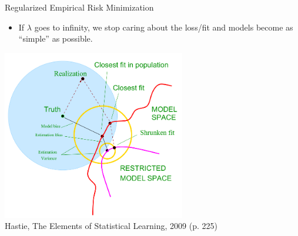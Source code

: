 \documentclass[11pt,compress,t,notes=noshow, xcolor=table]{beamer}
\begin{document}
\begin{vbframe}{Regularized Empirical Risk Minimization}
\begin{itemize}
  \item If $\lambda$ goes to infinity, we stop caring about the loss/fit and models become as \enquote{simple} as possible.
\end{itemize}

\framebreak


\center
\vspace*{0.5cm}
\includegraphics[width=0.6\textwidth]{figure_man/biasvariance_scheme.png} \\
\footnotesize{Hastie, The Elements of Statistical Learning, 2009 (p. 225)}


\end{vbframe}



\endlecture
\end{document}
